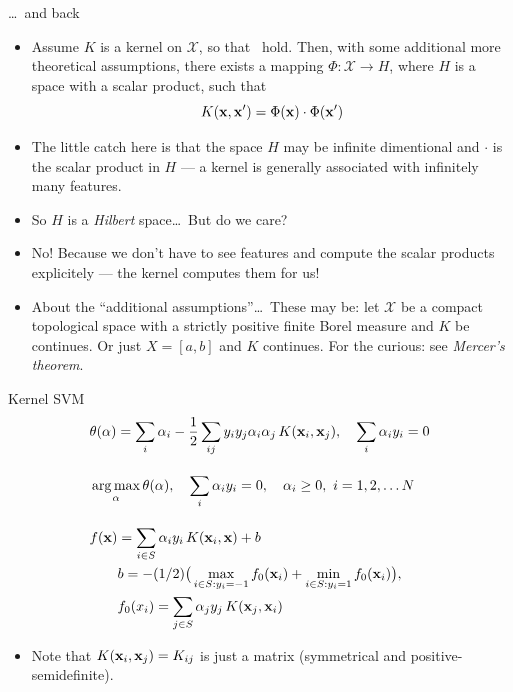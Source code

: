 \documentclass[handout]{beamer}   %
\def\X{\mathcal{X}}
\def\argmax{\mathop{\rm arg\,max}\limits}
\def\b#1{{\bf #1}}
\begin{document}
\begin{frame}{\dots\ and back}
  \begin{itemize}[<+->]
  \item Assume $K$ is a kernel on $\X$, so that \iskernel\ hold. Then, with some additional more theoretical
    assumptions, there exists a mapping $\Phi:\X\to H$, where $H$ is a space with a scalar product, such that
    \begin{equation*}
      K(\b x, \b x')=\Phi(\b x)\cdot\Phi(\b x')
    \end{equation*}
  \item The little catch here is that the space $H$ may be infinite dimentional
    and $\cdot$ is the scalar product in $H$ --- a kernel is generally associated with infinitely many features.
  \item So $H$ is a {\it Hilbert\/} space\dots\ But do we care?
  \item No! Because we don't have to see features and compute the scalar products explicitely --- 
    the kernel computes them for us!
  \item About the ``additional assumptions''\dots\ These may be: let $\X$ be a compact
    topological space with a strictly positive finite Borel measure and $K$ be continues.
    Or just $X=[a,b]$ and $K$ continues. For the curious: see {\it Mercer's theorem}.
  \end{itemize}
\end{frame}


\begin{frame}{Kernel SVM}
  \begin{align*}
    & \theta(\alpha) = 
    \sum_i\alpha_i
    - {1\over 2}\sum_{ij}y_iy_j\alpha_i\alpha_j\,K(\b x_i,\b x_j),
    \quad \sum_i\alpha_iy_i=0 \\[10pt]
    & \argmax_\alpha \theta(\alpha), \quad
    \sum_i\alpha_iy_i=0, \quad \alpha_i \ge 0, \ i=1,2,\ldots N \\[10pt]
    & f(\b x) = \sum_{i\in S}\alpha_i y_i\,K(\b x_i,\b x) + b\\
    & \qquad b = - (1/2)\big(\max_{i\in S:y_i=-1}f_0(\b x_i) + \min_{i\in S:y_i=1}f_0(\b x_i)\big),\\
    & \qquad f_0(x_i) = \sum_{j\in S}\alpha_j y_j\,K(\b x_j,\b x_i)
  \end{align*}
  \begin{itemize}[<+->]
  \item Note that $K(\b x_i,\b x_j)=K_{ij}$ is just a matrix
    (symmetrical and positive-semidefinite).
  \end{itemize}
\end{frame}
\end{document}
